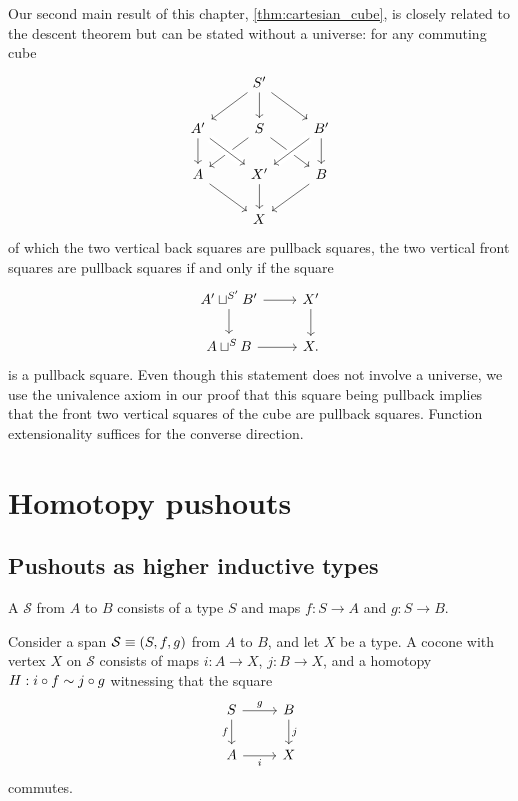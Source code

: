 Our second main result of this chapter, \cref{thm:cartesian_cube}, is closely related to the descent theorem but can be stated without a universe: for any commuting cube
\begin{equation*}
\begin{tikzcd}
& S' \arrow[dl] \arrow[dr] \arrow[d] \\
A' \arrow[d] & S \arrow[dl] \arrow[dr] & B' \arrow[dl,crossing over] \arrow[d] \\
A \arrow[dr] & X' \arrow[d] \arrow[from=ul,crossing over] & B \arrow[dl] \\
& X
\end{tikzcd}
\end{equation*}
of which the two vertical back squares are pullback squares, the two vertical front squares are pullback squares if and only if the square
\begin{equation*}
\begin{tikzcd}
A' \sqcup^{S'} B' \arrow[r] \arrow[d] & X' \arrow[d] \\
A\sqcup^{S} B \arrow[r] & X.
\end{tikzcd}
\end{equation*}
is a pullback square. Even though this statement does not involve a universe, we use the univalence axiom in our proof that this square being pullback implies that the front two vertical squares of the cube are pullback squares. Function extensionality suffices for the converse direction. 


\section{Homotopy pushouts}

\subsection{Pushouts as higher inductive types}

\begin{defn}
A  $\mathcal{S}$ from $A$ to $B$ consists of a type $S$ and maps $f:S\to A$ and $g:S\to B$.
\end{defn}

\begin{defn}
Consider a span $\mathcal{S}\equiv (S,f,g)$ from $A$ to $B$, and let $X$ be a type. A cocone with vertex $X$ on $\mathcal{S}$ consists of maps $i:A\to X$, $j:B\to X$, and a homotopy $H:i\circ f\sim j\circ g$ witnessing that the square
\begin{equation*}
\begin{tikzcd}
S \arrow[d,swap,"f"] \arrow[r,"g"] & B \arrow[d,"j"] \\
A \arrow[r,swap,"i"] & X
\end{tikzcd}
\end{equation*}
commutes.
\end{defn}

